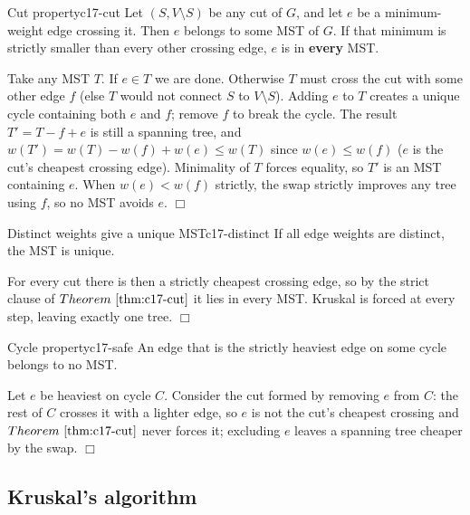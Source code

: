 \begin{theorem}{Cut property}{c17-cut}
Let \((S, V\setminus S)\) be any cut of \(G\), and let \(e\) be a minimum-weight
edge crossing it.  Then \(e\) belongs to some MST of \(G\).  If that minimum is
strictly smaller than every other crossing edge, \(e\) is in \textbf{every} MST.
\end{theorem}

\begin{proofbox}
Take any MST \(T\).  If \(e\in T\) we are done.  Otherwise \(T\) must cross the
cut with some other edge \(f\) (else \(T\) would not connect \(S\) to
\(V\setminus S\)).  Adding \(e\) to \(T\) creates a unique cycle containing
both \(e\) and \(f\); remove \(f\) to break the cycle.  The result
\(T' = T - f + e\) is still a spanning tree, and \(w(T')=w(T)-w(f)+w(e)\le w(T)\)
since \(w(e)\le w(f)\) (\(e\) is the cut's cheapest crossing edge).  Minimality
of \(T\) forces equality, so \(T'\) is an MST containing \(e\).  When
\(w(e)<w(f)\) strictly, the swap strictly improves any tree using \(f\), so no
MST avoids \(e\).  \(\Box\)
\end{proofbox}

\begin{corollary}{Distinct weights give a unique MST}{c17-distinct}
If all edge weights are distinct, the MST is unique.
\end{corollary}

\begin{proofbox}
For every cut there is then a strictly cheapest crossing edge, so by the strict
clause of \(\thmref{c17-cut}\) it lies in every MST.  Kruskal is forced at every
step, leaving exactly one tree. \(\Box\)
\end{proofbox}

\begin{lemma}{Cycle property}{c17-safe}
An edge that is the strictly heaviest edge on some cycle belongs to no MST.
\end{lemma}

\begin{proofbox}
Let \(e\) be heaviest on cycle \(C\).  Consider the cut formed by removing \(e\)
from \(C\): the rest of \(C\) crosses it with a lighter edge, so \(e\) is not the
cut's cheapest crossing and \(\thmref{c17-cut}\) never forces it; excluding \(e\)
leaves a spanning tree cheaper by the swap. \(\Box\)
\end{proofbox}

\subsection{Kruskal's algorithm}

